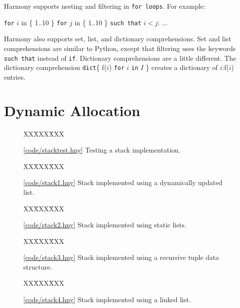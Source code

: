\documentclass{report}
\newcommand{\harmonysource}[1]{
\begin{tabbing}
XX\=XXX\=XXX\kill
    
\end{tabbing}
}
\newcommand{\harmonylink}[1]{%
[\href{https://www.cs.cornell.edu/home/rvr/harmony/#1}{\underline{#1}}]%
}
\newenvironment{code}{
\tcolorbox
}{
\endtcolorbox
}
\begin{document}
Harmony supports nesting and filtering in \texttt{for loops}.
For example:
\begin{code}
\texttt{for} $i$ in \{ 1..10 \}
\texttt{for} $j$ in \{ 1..10 \}
\texttt{such that} $i < j$: ...
\end{code}

Harmony also supports set, list, and dictionary comprehensions.
%
Set and list comprehensions are similar to Python, except that filtering uses
the keywords \texttt{such that} instead of \texttt{if}.
Dictionary comprehensions are a little different.
The dictionary comprehension \texttt{dict}\{ f($i$) \texttt{for} $i$ \texttt{in} $I$ \}
creates a dictionary of $i$:f($i$) entries.

\section{Dynamic Allocation}

\begin{figure}
\begin{code}
\harmonysource{stacktest}
\end{code}
\caption{\harmonylink{code/stacktest.hny} Testing a stack implementation.}
\label{fig:stacktest}
\end{figure}

\begin{figure}
\begin{code}
\harmonysource{stack1}
\end{code}
\caption{\harmonylink{code/stack1.hny} Stack implemented using a dynamically updated list.}
\label{fig:stack1}
\end{figure}

\begin{figure}
\begin{code}
\harmonysource{stack2}
\end{code}
\caption{\harmonylink{code/stack2.hny} Stack implemented using static lists.}
\label{fig:stack2}
\end{figure}

\begin{figure}
\begin{code}
\harmonysource{stack3}
\end{code}
\caption{\harmonylink{code/stack3.hny} Stack implemented using a recursive tuple data structure.}
\label{fig:stack3}
\end{figure}

\begin{figure}
\begin{code}
\harmonysource{stack4}
\end{code}
\caption{\harmonylink{code/stack4.hny} Stack implemented using a linked list.}
\label{fig:stack4}
\end{figure}
\end{document}
